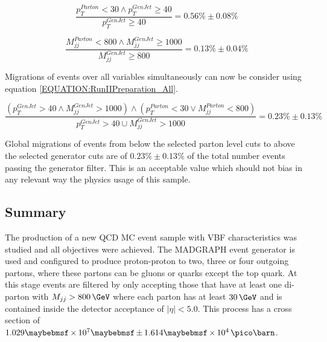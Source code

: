 \begin{equation}
\label{EQUATION:RunIIPreparation_SigleVariableMigrationSubleadPt}
\frac{p_{T}^{Parton}<30 \wedge p_{T}^{GenJet} \geq 40}{p_{T}^{GenJet} \geq 40}=0.56\% \pm 0.08\%
\end{equation}

\begin{equation}
\label{EQUATION:RunIIPreparation_SigleVariableMigrationMjj}
\frac{M_{jj}^{Parton}<800 \wedge M_{jj}^{GenJet} \geq 1000}{M_{jj}^{GenJet} \geq 800}=0.13\% \pm 0.04\%
\end{equation}
\normalsize

Migrations of events over all variables simultaneously can now be consider using equation \ref{EQUATION:RunIIPreparation_All}.

\small
\begin{equation}
\label{EQUATION:RunIIPreparation_All}
\frac{(p_{T}^{GenJet}>40 \wedge M_{jj}^{GenJet}>1000) \wedge (p_{T}^{Parton}<30 \vee M_{jj}^{Parton}<800)}{p_{T}^{GenJet}>40 \cup M_{jj}^{GenJet}>1000} = 0.23\% \pm 0.13\%
\end{equation}
\normalsize

Global migrations of events from below the selected parton level cuts to above the selected generator cuts are of $0.23\% \pm 0.13\%$ of the total number events passing the generator filter. This is an acceptable value which should not bias in any relevant way the physics usage of this sample.

\subsection{Summary}
\label{SUBSECTION:RunIIPreparation_Summary}


The production of a new \gls{QCD} \gls{MC} event sample with \gls{VBF} characteristics was studied and all objectives were achieved. The \textsc{MADGRAPH} event generator is used and configured to produce proton-proton to two, three or four outgoing partons, where these partons can be gluons or quarks except the top quark. At this stage events are filtered by only accepting those that have at least one di-parton with $M_{jj}>800\,\GeV$ where each parton has at least $30\,\GeV$ and is contained inside the detector acceptance of $|\eta|<5.0$. This process has a cross section of $1.029 \times 10^7 \pm 1.614 \times 10^4 \,\pico\barn$. 

